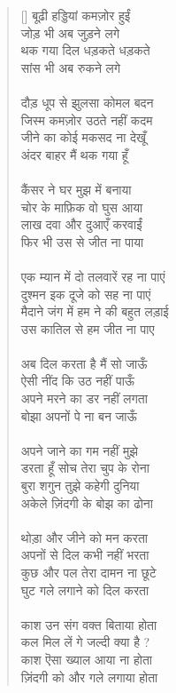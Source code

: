 \begin{verse}[\versewidth]\texthindi{
बूढ़ी हड्डियां कमज़ोर हुईं\\
जोड़ भी अब जुड़ने लगे\\
थक गया दिल धड़कते धड़कते\\
सांस भी अब रुकने लगे\\
\\
दौड़ धूप से झुलसा कोमल बदन\\
जिस्म कमज़ोर उठते नहीं कदम\\
जीने का कोई मकसद ना देखूँ\\
अंदर बाहर मैं थक गया हूँ\\
\\
कैंसर ने घर मुझ में बनाया\\
चोर के माफ़िक वो घुस आया\\
लाख दवा और दुआएँ करवाईं\\
फिर भी उस से जीत ना पाया\\
\\
एक म्यान में दो तलवारें रह ना पाएं\\
दुश्मन इक दूजे को सह ना पाएं\\
मैदाने जंग में हम ने की बहुत लड़ाई\\
उस कातिल से हम जीत ना पाए\\
\\
अब दिल करता है मैं सो जाऊँ\\
ऐसी नींद कि उठ नहीं पाऊँ\\
अपने मरने का डर नहीं लगता\\
बोझा अपनों पे ना बन जाऊँ\\
\\
अपने जाने का गम नहीं मुझे\\
डरता हूँ सोच तेरा चुप के रोना\\
बुरा शगुन तुझे कहेगी दुनिया\\
अकेले ज़िंदगी के बोझ का ढोना\\
\\
थोड़ा और जीने को मन करता\\
अपनों से दिल कभी नहीं भरता\\
कुछ और पल तेरा दामन ना छूटे\\
घुट गले लगाने को दिल करता\\
\\
काश उन संग वक्त बिताया होता\\
कल मिल लें गे जल्दी क्या है ?\\
काश ऎसा ख्याल आया ना होता\\
ज़िंदगी को और गले लगाया होता\\
}
\end{verse}
